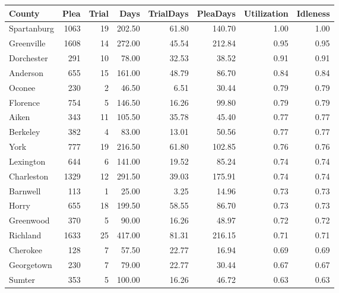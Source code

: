 \begin{tabular}{lrrrrrrr}
\toprule
      County &  Plea &  Trial &   Days &  TrialDays &  PleaDays &  Utilization &  Idleness \\
\midrule
 Spartanburg &  1063 &     19 & 202.50 &      61.80 &    140.70 &         1.00 &      1.00 \\
  Greenville &  1608 &     14 & 272.00 &      45.54 &    212.84 &         0.95 &      0.95 \\
  Dorchester &   291 &     10 &  78.00 &      32.53 &     38.52 &         0.91 &      0.91 \\
    Anderson &   655 &     15 & 161.00 &      48.79 &     86.70 &         0.84 &      0.84 \\
      Oconee &   230 &      2 &  46.50 &       6.51 &     30.44 &         0.79 &      0.79 \\
    Florence &   754 &      5 & 146.50 &      16.26 &     99.80 &         0.79 &      0.79 \\
       Aiken &   343 &     11 & 105.50 &      35.78 &     45.40 &         0.77 &      0.77 \\
    Berkeley &   382 &      4 &  83.00 &      13.01 &     50.56 &         0.77 &      0.77 \\
        York &   777 &     19 & 216.50 &      61.80 &    102.85 &         0.76 &      0.76 \\
   Lexington &   644 &      6 & 141.00 &      19.52 &     85.24 &         0.74 &      0.74 \\
  Charleston &  1329 &     12 & 291.50 &      39.03 &    175.91 &         0.74 &      0.74 \\
    Barnwell &   113 &      1 &  25.00 &       3.25 &     14.96 &         0.73 &      0.73 \\
       Horry &   655 &     18 & 199.50 &      58.55 &     86.70 &         0.73 &      0.73 \\
   Greenwood &   370 &      5 &  90.00 &      16.26 &     48.97 &         0.72 &      0.72 \\
    Richland &  1633 &     25 & 417.00 &      81.31 &    216.15 &         0.71 &      0.71 \\
    Cherokee &   128 &      7 &  57.50 &      22.77 &     16.94 &         0.69 &      0.69 \\
  Georgetown &   230 &      7 &  79.00 &      22.77 &     30.44 &         0.67 &      0.67 \\
      Sumter &   353 &      5 & 100.00 &      16.26 &     46.72 &         0.63 &      0.63 \\

\end{tabular}
